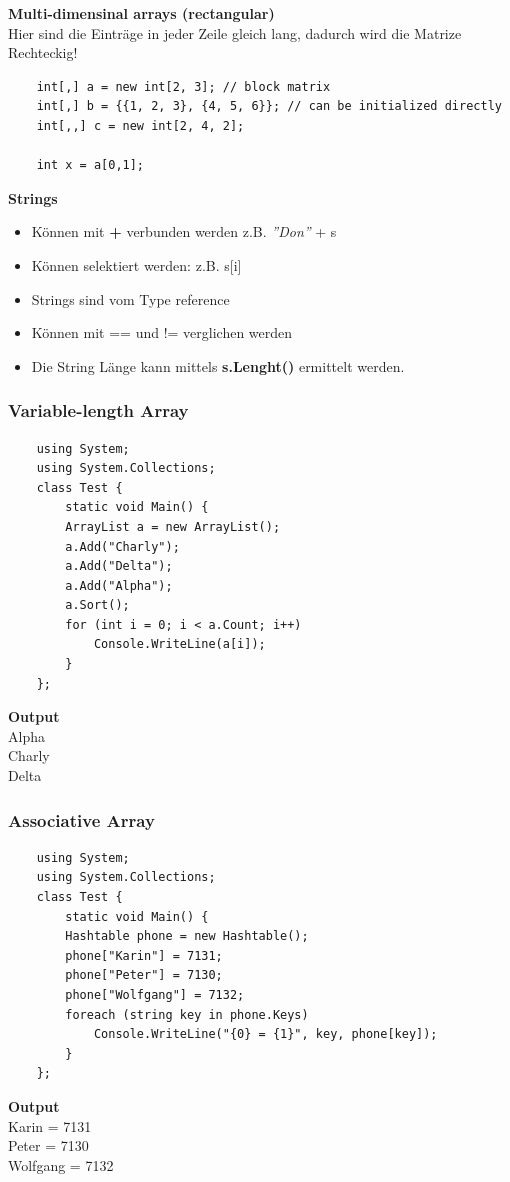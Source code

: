 \textbf{Multi-dimensinal arrays (rectangular)}\\
Hier sind die Einträge in jeder Zeile gleich lang, dadurch wird die Matrize Rechteckig!
\begin{lstlisting}
	int[,] a = new int[2, 3]; // block matrix 
	int[,] b = {{1, 2, 3}, {4, 5, 6}}; // can be initialized directly 
	int[,,] c = new int[2, 4, 2];
	
	int x = a[0,1];
\end{lstlisting}

\textbf{Strings}
\begin{itemize}
	\item Können mit \textbf{+} verbunden werden z.B. \textit{''Don''} + s
	\item Können selektiert werden: z.B. s[i]
	\item Strings sind vom Type reference
	\item Können mit == und != verglichen werden
	\item Die String Länge kann mittels \textbf{s.Lenght()} ermittelt werden.
\end{itemize}

\subsubsection{Variable-length Array}
\begin{multicols}{2}

	\begin{lstlisting}
	using System;
	using System.Collections;
	class Test {
		static void Main() {
		ArrayList a = new ArrayList();
		a.Add("Charly");
		a.Add("Delta");
		a.Add("Alpha");
		a.Sort();
		for (int i = 0; i < a.Count; i++)
			Console.WriteLine(a[i]);
		}
	};
	\end{lstlisting}
	\columnbreak
	
	\textbf{Output}\\
		Alpha\\
		Charly\\
		Delta\\
\end{multicols}


\subsubsection{Associative Array}
\begin{multicols}{2}

	\begin{lstlisting}
	using System;
	using System.Collections;
	class Test {
		static void Main() {
		Hashtable phone = new Hashtable();
		phone["Karin"] = 7131;
		phone["Peter"] = 7130;
		phone["Wolfgang"] = 7132;
		foreach (string key in phone.Keys)
			Console.WriteLine("{0} = {1}", key, phone[key]);
		}
	};
	\end{lstlisting}
	\columnbreak
	
	\textbf{Output}\\
		Karin = 7131\\
		Peter = 7130\\
		Wolfgang = 7132\\
\end{multicols}



